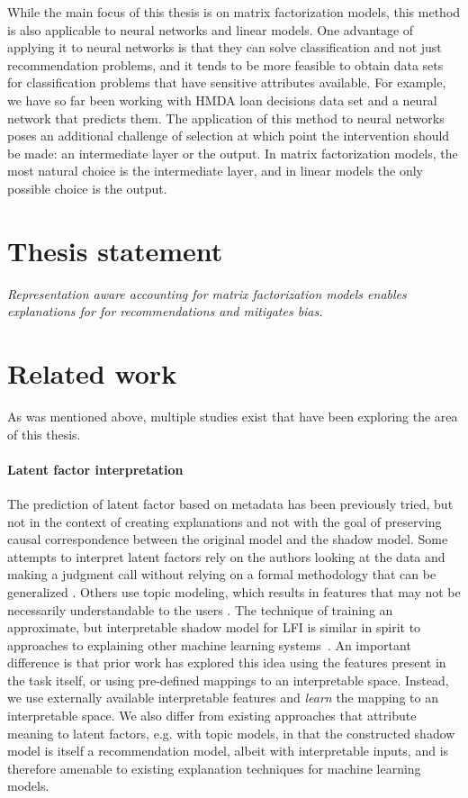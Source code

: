 While the main focus of this thesis is on matrix factorization models, this
method is also applicable to neural networks and linear models. One advantage of
applying it to neural networks is that they can solve classification and not
just recommendation problems, and it tends to be more feasible to obtain data
sets for classification problems that have sensitive attributes available. For
example, we have so far been working with HMDA loan decisions data set and a
neural network that predicts them. The application of this method to neural
networks poses an additional challenge of selection at which point the
intervention should be made: an intermediate layer or the output. In matrix
factorization models, the most natural choice is the intermediate layer, and in
linear models the only possible choice is the output.

\section{Thesis statement}

\emph{Representation aware accounting for matrix factorization models enables
explanations for for recommendations and mitigates bias.}

\section{Related work}

As was mentioned above, multiple studies exist that have been exploring the
area of this thesis.

\paragraph{Latent factor interpretation}
The prediction of latent factor based on metadata has been
previously tried\cite{gantner2010learning}, but not in the context of creating
explanations and not with the goal of preserving causal correspondence between
the original model and the shadow model. Some attempts to interpret latent
factors rely on the authors looking at the data and making a judgment call
without relying on a formal methodology that can be generalized
\cite{koren2009matrix}. Others use topic modeling, which results in features
that may not be necessarily understandable to the users
\cite{rossetti2013towards}. The technique of training an approximate, but
interpretable shadow
model for LFI is similar in spirit to approaches to explaining other
machine learning
systems~\cite{craven1995extracting,ribeiro2016lime,sanchez2015towards}.
An important difference is that prior work has explored this idea
using the features present in the task itself, or using pre-defined
mappings to an interpretable space. 
Instead, we use externally available interpretable features and
\emph{learn} the mapping to an interpretable space.
We also differ from existing approaches that attribute meaning to
latent factors, e.g.
with topic models\cite{rossetti2013towards}, in that the constructed
shadow model is itself a recommendation model, albeit with
interpretable inputs, and is therefore amenable to existing
explanation techniques for machine learning models.





